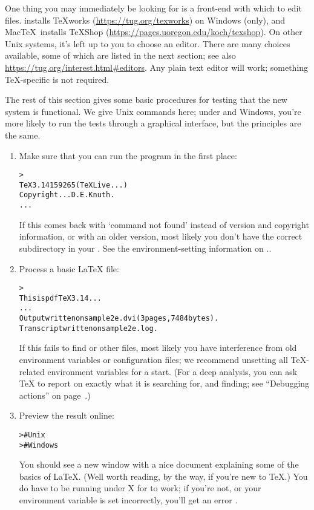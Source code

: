 \documentclass{article}
\begin{document}
One thing you may immediately be looking for is a front-end with which
to edit files.  \TL{} installs \TeX{}works
(\url{https://tug.org/texworks}) on Windows (only), and Mac\TeX\ installs
TeXShop (\url{https://pages.uoregon.edu/koch/texshop}).  On other Unix
systems, it's left up to you to choose an editor.  There are many
choices available, some of which are listed in the next section; see
also \url{https://tug.org/interest.html#editors}.  Any plain text editor
will work; something \TeX-specific is not required.

The rest of this section gives some basic procedures for testing that
the new system is functional.  We give Unix commands here; under
\MacOSX{} and Windows, you're more likely to run the tests through a
graphical interface, but the principles are the same.

\begin{enumerate}

\item Make sure that you can run the  program in the first
place:
\begin{alltt}
> 
TeX 3.14159265 (TeX Live ...)
Copyright ... D.E. Knuth.
...
\end{alltt}
If this comes back with `command not found' instead of version and
copyright information, or with an older version, most likely you don't
have the correct  subdirectory in your .  See
the environment-setting information on \p.\pageref{sec:env}.

\item Process a basic \LaTeX{} file:
\begin{alltt}
> 
This is pdfTeX 3.14...
...
Output written on sample2e.dvi (3 pages, 7484 bytes).
Transcript written on sample2e.log.
\end{alltt}
If this fails to find  or other files, most
likely you have interference from old environment variables or
configuration files; we recommend unsetting all \TeX-related environment
variables for a start.  (For a deep analysis, you can ask \TeX{} to
report on exactly what it is searching for, and finding; see ``Debugging
actions'' on page~\pageref{sec:debugging}.)

\item Preview the result online:
\begin{alltt}
>     # Unix
>   # Windows
\end{alltt}
You should see a new window with a nice document explaining some of the
basics of \LaTeX{}.  (Well worth reading, by the way, if you're new to
\TeX.)  You do have to be running under X for  to work; if
you're not, or your  environment variable is set
incorrectly, you'll get an error .


\end{enumerate}
\end{document}
